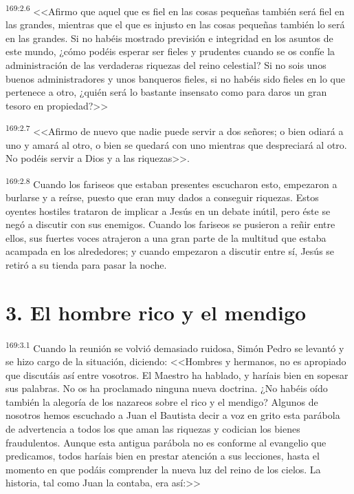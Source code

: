 \par 
\textsuperscript{169:2.6} <<Afirmo que aquel que es fiel en las cosas pequeñas también será fiel en las grandes, mientras que el que es injusto en las cosas pequeñas también lo será en las grandes. Si no habéis mostrado previsión e integridad en los asuntos de este mundo, ¿cómo podéis esperar ser fieles y prudentes cuando se os confíe la administración de las verdaderas riquezas del reino celestial? Si no sois unos buenos administradores y unos banqueros fieles, si no habéis sido fieles en lo que pertenece a otro, ¿quién será lo bastante insensato como para daros un gran tesoro en propiedad?>>

\par 
\textsuperscript{169:2.7} <<Afirmo de nuevo que nadie puede servir a dos señores; o bien odiará a uno y amará al otro, o bien se quedará con uno mientras que despreciará al otro. No podéis servir a Dios y a las riquezas>>.

\par 
\textsuperscript{169:2.8} Cuando los fariseos que estaban presentes escucharon esto, empezaron a burlarse y a reírse, puesto que eran muy dados a conseguir riquezas. Estos oyentes hostiles trataron de implicar a Jesús en un debate inútil, pero éste se negó a discutir con sus enemigos. Cuando los fariseos se pusieron a reñir entre ellos, sus fuertes voces atrajeron a una gran parte de la multitud que estaba acampada en los alrededores; y cuando empezaron a discutir entre sí, Jesús se retiró a su tienda para pasar la noche.

\section*{3. El hombre rico y el mendigo}
\par 
\textsuperscript{169:3.1} Cuando la reunión se volvió demasiado ruidosa, Simón Pedro se levantó y se hizo cargo de la situación, diciendo: <<Hombres y hermanos, no es apropiado que discutáis así entre vosotros. El Maestro ha hablado, y haríais bien en sopesar sus palabras. No os ha proclamado ninguna nueva doctrina. ¿No habéis oído también la alegoría de los nazareos sobre el rico y el mendigo? Algunos de nosotros hemos escuchado a Juan el Bautista decir a voz en grito esta parábola de advertencia a todos los que aman las riquezas y codician los bienes fraudulentos. Aunque esta antigua parábola no es conforme al evangelio que predicamos, todos haríais bien en prestar atención a sus lecciones, hasta el momento en que podáis comprender la nueva luz del reino de los cielos. La historia, tal como Juan la contaba, era así:>>

